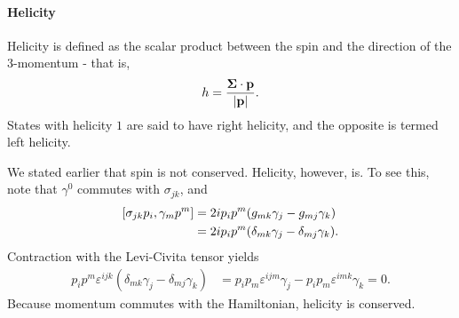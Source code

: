 \paragraph{Helicity}
Helicity is defined as the scalar product between the spin and the direction of the 3-momentum - that is,
\begin{align*}
	h = \frac{\vb*{\Sigma}\cdot\vb{p}}{\abs{\vb{p}}}.
\end{align*}
States with helicity $1$ are said to have right helicity, and the opposite is termed left helicity.

We stated earlier that spin is not conserved. Helicity, however, is. To see this, note that $\gamma^{0}$ commutes with $\sigma_{jk}$, and
\begin{align*}
	\comm{\sigma_{jk}p_{i}}{\gamma_{m}p^{m}} &= 2ip_{i}p^{m}(g_{mk}\gamma_{j} - g_{mj}\gamma_{k}) \\
	                                         &= 2ip_{i}p^{m}(\delta_{mk}\gamma_{j} - \delta_{mj}\gamma_{k}).
\end{align*}
Contraction with the Levi-Civita tensor yields
\begin{align*}
	p_{i}p^{m}\varepsilon^{ijk}(\delta_{mk}\gamma_{j} - \delta_{mj}\gamma_{k}) &= p_{i}p_{m}\varepsilon^{ijm}\gamma_{j} - p_{i}p_{m}\varepsilon^{imk}\gamma_{k} = 0.
\end{align*}
Because momentum commutes with the Hamiltonian, helicity is conserved.

